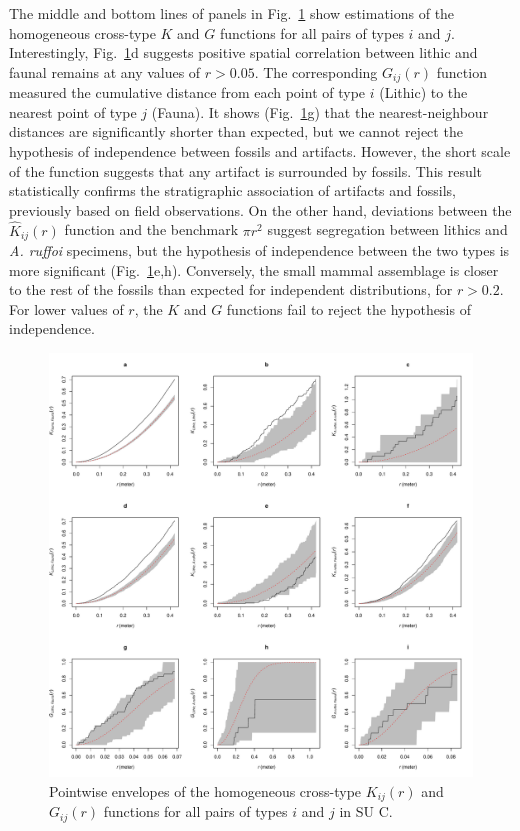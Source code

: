 \documentclass[review,authoryear]{elsarticle} %
\begin{document}
The middle and bottom lines of panels in Fig.~\ref{fig:7} show estimations of the homogeneous cross-type $K$ and $G$ functions for all pairs of types $i$ and $j$. Interestingly, Fig.~\ref{fig:7}d suggests positive spatial correlation between lithic and faunal remains at any values of $r>0.05$. The corresponding $G_{ij}(r)$ function measured the cumulative distance from each point of type $i$ (Lithic) to the nearest point of type $j$ (Fauna). It shows (Fig.~\ref{fig:7}g) that the nearest-neighbour distances are significantly shorter than expected, but we cannot reject the hypothesis of independence between fossils and artifacts. However, the short scale of the function suggests that any artifact is surrounded by fossils. This result statistically confirms the stratigraphic association of artifacts and fossils, previously based on field observations. On the other hand, deviations between the $\hat{K}_{ij}(r)$ function and the benchmark $\pi r^2$ suggest segregation between lithics and \emph{A. ruffoi} specimens, but the hypothesis of independence between the two types is more significant (Fig.~\ref{fig:7}e,h). Conversely, the small mammal assemblage is closer to the rest of the fossils than expected for independent distributions, for $r>0.2$. For lower values of $r$, the $K$ and $G$ functions fail to reject the hypothesis of independence.

\begin{figure}
  \centering
  \includegraphics[width=1\textwidth]{../artwork/Fig7.pdf}
  \caption{Pointwise envelopes of the homogeneous cross-type $K_{ij}(r)$ and $G_{ij}(r)$ functions for all pairs of types $i$ and $j$ in SU C.}
  \label{fig:7}
\end{figure}
\end{document}
